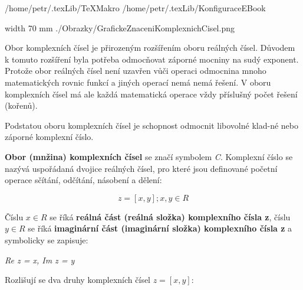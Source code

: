\def\addr{/home/petr/.texLib}

 \addr/TeXMakro
\setAddress{\addr}
 \addr/KonfiguraceEBook


\pdfximage width 70 mm {./Obrazky/GrafickeZnaceniKomplexnichCisel.png}


\Obsah


Obor komplexních čísel je přirozeným rozšířením oboru reálných čísel. Důvodem k tomuto rozšíření byla potřeba odmocňovat záporné mocniny na sudý exponent. Protože obor reálných čísel není uzavřen vůči operaci odmocnina mnoho matematických rovnic funkcí a jiných operací nemá nemá řešení. V oboru komplexních čísel má ale každá matematická operace vždy příslušný počet řešení (kořenů). 

Podstatou oboru komplexních čísel je schopnost odmocnit libovolné klad-né nebo záporné komplexní číslo.


{\bf Obor (mnžina) komplexních čísel} se značí symbolem {\it C}.  Komplexní číslo se nazývá uspořádaná dvojice reálných čísel, pro které jsou definované početní operace sčítání, odčítání, násobení a dělení:

$$ z = [x,y]; x,y \in R $$

Číslu $x \in R $ se říká {\bf reálná část (reálná složka) komplexního čísla z}, číslu $y \in R $ se říká {\bf imaginární část (imaginární složka) komplexního čísla z} a symbolicky se zapisuje:

\centerline{\it Re z = x, Im z = y}

Rozlišují se dva druhy komplexních čísel $z=[x,y]$:

\vskip 4mm



